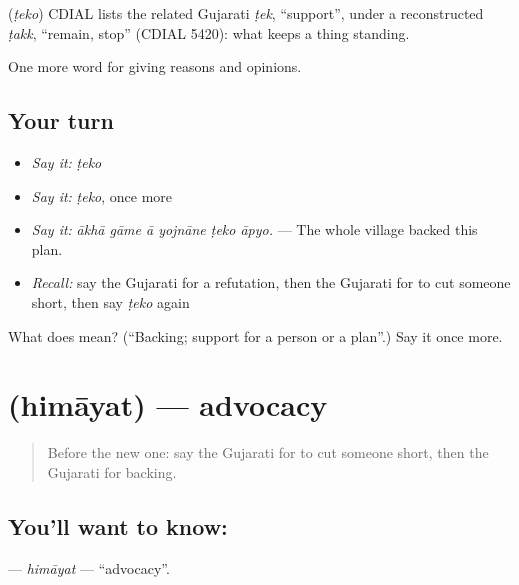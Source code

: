 \begin{cousinweb}
\textbf{} (\emph{ṭeko}) CDIAL lists the related Gujarati \emph{ṭek}, \textquotedblleft{}support\textquotedblright{}, under a reconstructed \emph{ṭakk}, \textquotedblleft{}remain, stop\textquotedblright{} (CDIAL 5420): what keeps a thing standing.
\end{cousinweb}

\begin{grammarlens}[title={What you've built}]
One more word for giving reasons and opinions.
\end{grammarlens}

\subsection*{Your turn}
\begin{itemize}
\raggedright
  \item \emph{Say it:} \emph{ṭeko}
  \item \emph{Say it:} \emph{ṭeko}, once more
  \item \emph{Say it:} \emph{ākhā gāme ā yojnāne ṭeko āpyo.} — The whole village backed this plan.
  \item \emph{Recall:} say the Gujarati for a refutation, then the Gujarati for to cut someone short, then say \emph{ṭeko} again
\end{itemize}

\begin{tcolorbox}[breakable,colback=teal!4,colframe=teal!35!black,title={Before you move on}]
What does  mean? (\textquotedblleft{}Backing; support for a person or a plan\textquotedblright{}.) Say it once more.
\end{tcolorbox}
\section[\texorpdfstring{\gu{હિમાયત} (himāyat)}{હિમાયત (himāyat)}]{ (himāyat) — advocacy}

\label{lesson:GU-C343-himayat}



\begin{quote}
Before the new one: say the Gujarati for to cut someone short, then the Gujarati for backing.
\end{quote}

\subsection*{You'll want to know: }
\textbf{} — \emph{himāyat} — \textquotedblleft{}advocacy\textquotedblright{}.

